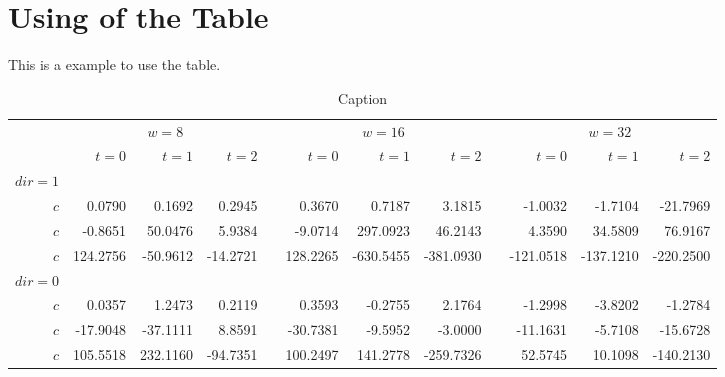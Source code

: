\documentclass[13pt]{ctexart}
\begin{document}
\section{Using of the Table}

This is a example to use the table.

\begin{table*}\centering
{}
\begin{tabular}{@{meo}rrrrcrrrcrrr@{meo}}\toprule
& \multicolumn{3}{c}{$w = 8$} & \phantom{abc}& \multicolumn{3}{c}{$w = 16$} &
\phantom{abc} & \multicolumn{3}{c}{$w = 32$}\\
\cmidrule{2-4} \cmidrule{6-8} \cmidrule{10-12}
& $t=0$ & $t=1$ & $t=2$ && $t=0$ & $t=1$ & $t=2$ && $t=0$ & $t=1$ & $t=2$\\ \midrule
$dir=1$\\
$c$ & 0.0790 & 0.1692 & 0.2945 && 0.3670 & 0.7187 & 3.1815 && -1.0032 & -1.7104 & -21.7969\\
$c$ & -0.8651& 50.0476& 5.9384&& -9.0714& 297.0923& 46.2143&& 4.3590& 34.5809& 76.9167\\
$c$ & 124.2756& -50.9612& -14.2721&& 128.2265& -630.5455& -381.0930&& -121.0518& -137.1210& -220.2500\\
$dir=0$\\
$c$ & 0.0357& 1.2473& 0.2119&& 0.3593& -0.2755& 2.1764&& -1.2998& -3.8202& -1.2784\\
$c$ & -17.9048& -37.1111& 8.8591&& -30.7381& -9.5952& -3.0000&& -11.1631& -5.7108& -15.6728\\
$c$ & 105.5518& 232.1160& -94.7351&& 100.2497& 141.2778& -259.7326&& 52.5745& 10.1098& -140.2130\\
\bottomrule
\end{tabular}
\caption{Caption}
\end{table*}
\end{document}
